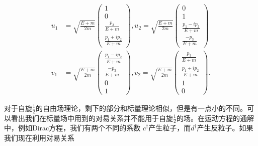 \begin{align}
\label{equ9.36}
    u_1 &= \sqrt{ \frac{E + m}{2m} }
        \begin{pmatrix}
            1 \\ 0 \\ \frac{p_3}{E + m} \\ \frac{p_1 + i p_2}{E + m}
        \end{pmatrix},
    u_2 = \sqrt{ \frac{E + m}{2m} }
        \begin{pmatrix}
            0 \\ 1 \\ \frac{p_1 - ip_2}{E + m} \\ \frac{-p_3}{E + m}
        \end{pmatrix} \\
\label{equ9.37}
    v_1 &= \sqrt{ \frac{E + m}{2m} }
        \begin{pmatrix}
            \frac{p_1 - ip_2}{E + m} \\ \frac{-p_3}{E + m} \\ 0 \\ 1
        \end{pmatrix},
    v_2 = \sqrt{ \frac{E + m}{2m} }
        \begin{pmatrix}
            \frac{p_3}{E + m} \\ \frac{p_1 + ip_2}{E + m} \\ 1 \\ 0
        \end{pmatrix}.
\end{align}


对于自旋$\frac{1}{2}$的自由场理论，剩下的部分和标量理论相似，但是有一点小的不同。可以看出我们在标量场中用到的对易关系并不能用于自旋$\frac{1}{2}$的场。在运动方程的通解中，例如Dirac方程，我们有两个不同的系数 $c^{\dagger}$产生粒子，而$d^{\dagger}$产生反粒子。如果我们现在利用对易关系

